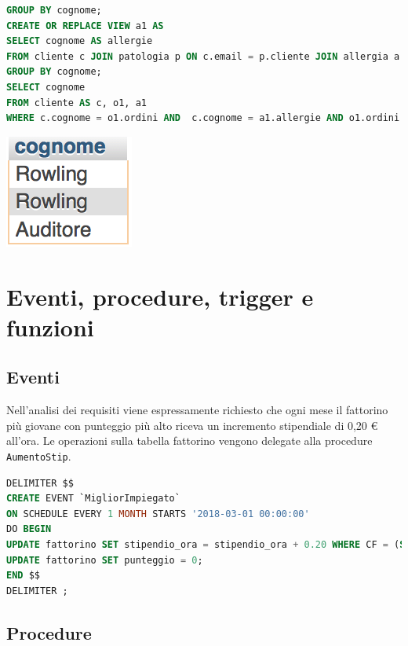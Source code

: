 \documentclass[10pt]{article}
\begin{document}
\begin{enumerate}[noitemsep]
\begin{lstlisting}[language=sql]
GROUP BY cognome;
CREATE OR REPLACE VIEW a1 AS
SELECT cognome AS allergie
FROM cliente c JOIN patologia p ON c.email = p.cliente JOIN allergia a ON p.allergia = a.codice
GROUP BY cognome;
SELECT cognome
FROM cliente AS c, o1, a1
WHERE c.cognome = o1.ordini AND  c.cognome = a1.allergie AND o1.ordini = a1.allergie
\end{lstlisting}	
\begin{center}
\hspace*{-1cm}
\includegraphics[scale=0.9]{query3.png}
\hspace*{-1cm}
\end{center}

	\end{enumerate}
		\section{Eventi, procedure, trigger e funzioni}
		\subsection{Eventi}
		Nell'analisi dei requisiti viene espressamente richiesto che ogni mese il fattorino pi\`u giovane con punteggio pi\`u alto riceva un incremento stipendiale di 0,20 \euro{} all'ora.
		Le operazioni sulla tabella fattorino vengono delegate alla procedure \texttt{AumentoStip}.
\begin{lstlisting}[language=sql]
DELIMITER $$
CREATE EVENT `MigliorImpiegato` 
ON SCHEDULE EVERY 1 MONTH STARTS '2018-03-01 00:00:00'
DO BEGIN 
UPDATE fattorino SET stipendio_ora = stipendio_ora + 0.20 WHERE CF = (SELECT CF FROM fattorino WHERE CF NOT IN (SELECT f1.CF FROM fattorino f1 CROSS JOIN fattorino f2 WHERE f1.data_di_nascita < f2.data_di_nascita AND f1.punteggio < f2.punteggio AND f1.CF != f2.CF));
UPDATE fattorino SET punteggio = 0;
END $$
DELIMITER ;
\end{lstlisting}
		\subsection{Procedure}
\end{document}

